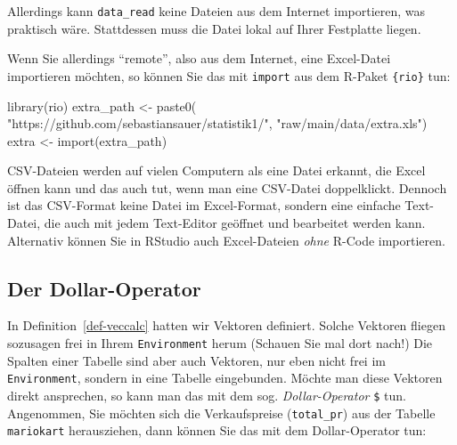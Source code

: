 \documentclass[
  letterpaper,
  twoside,
  open=any]{scrbook}
\newenvironment{Shaded}{\begin{snugshade}}{\end{snugshade}}
\newcommand{\DocumentationTok}[1]{\textcolor[rgb]{0.37,0.37,0.37}{\textit{#1}}}
\newcommand{\FunctionTok}[1]{\textcolor[rgb]{0.28,0.35,0.67}{#1}}
\newcommand{\NormalTok}[1]{\textcolor[rgb]{0.00,0.23,0.31}{#1}}
\newcommand{\OtherTok}[1]{\textcolor[rgb]{0.00,0.23,0.31}{#1}}
\newcommand{\SpecialCharTok}[1]{\textcolor[rgb]{0.37,0.37,0.37}{#1}}
\newcommand{\StringTok}[1]{\textcolor[rgb]{0.13,0.47,0.30}{#1}}
\theoremstyle{definition}
\theoremstyle{definition}
\theoremstyle{definition}
\theoremstyle{remark}
\begin{document}
Allerdings kann \texttt{data\_read} keine Dateien aus dem Internet
importieren, was praktisch wäre. Stattdessen muss die Datei lokal auf
Ihrer Festplatte liegen.

Wenn Sie allerdings \enquote{remote}, also aus dem Internet, eine
Excel-Datei importieren möchten, so können Sie das mit \texttt{import}
aus dem R-Paket \texttt{\{rio\}} tun:

\begin{Shaded}
\begin{Highlighting}[]
\FunctionTok{library}\NormalTok{(rio)}
\NormalTok{extra\_path }\OtherTok{\textless{}{-}} \FunctionTok{paste0}\NormalTok{(}
  \StringTok{"https://github.com/sebastiansauer/statistik1/"}\NormalTok{,}
  \StringTok{"raw/main/data/extra.xls"}\NormalTok{)}
\NormalTok{extra }\OtherTok{\textless{}{-}} \FunctionTok{import}\NormalTok{(extra\_path)}
\end{Highlighting}
\end{Shaded}

CSV-Dateien werden auf vielen Computern als eine Datei erkannt, die
Excel öffnen kann und das auch tut, wenn man eine CSV-Datei
doppelklickt. Dennoch ist das CSV-Format keine Datei im Excel-Format,
sondern eine einfache Text-Datei, die auch mit jedem Text-Editor
geöffnet und bearbeitet werden kann. Alternativ können Sie in RStudio
auch Excel-Dateien \emph{ohne} R-Code importieren.

\subsection{Der Dollar-Operator}\label{sec-dollar-op}

In Definition~\ref{def-veccalc} hatten wir Vektoren definiert. Solche
Vektoren fliegen sozusagen frei in Ihrem \texttt{Environment} herum
(Schauen Sie mal dort nach!) Die Spalten einer Tabelle sind aber auch
Vektoren, nur eben nicht frei im \texttt{Environment}, sondern in eine
Tabelle eingebunden. Möchte man diese Vektoren direkt ansprechen, so
kann man das mit dem sog. \emph{Dollar-Operator} \texttt{\$} tun.
Angenommen, Sie möchten sich die Verkaufspreise (\texttt{total\_pr}) aus
der Tabelle \texttt{mariokart} herausziehen, dann können Sie das mit dem
Dollar-Operator tun:

\begin{Shaded}
\end{Shaded}
\end{document}

